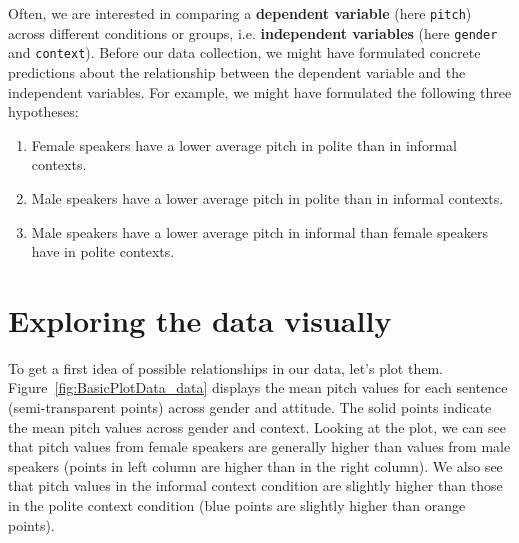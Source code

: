 \documentclass[nobib]{tufte-handout}
\begin{document}
Often, we are interested in comparing a \textbf{dependent variable} (here \texttt{pitch})
across different conditions or groups, i.e. \textbf{independent variables} (here \texttt{gender} and \texttt{context}). Before our data collection,
we might have formulated concrete predictions about the relationship between the dependent
variable and the independent variables. For example, we might have formulated the following three
hypotheses:

\begin{enumerate}[{H}1:]
\item Female speakers have a lower average pitch in polite than in informal contexts.
\item Male speakers have a lower average pitch in polite than in informal contexts.
\item Male speakers have a lower average pitch in informal than female speakers have in polite contexts.
\end{enumerate}

\section{Exploring the data visually}

To get a first idea of possible relationships in our data, let's plot
them. Figure~\ref{fig:BasicPlotData_data} displays the mean pitch values for each
sentence (semi-transparent points) across gender and attitude. The solid points indicate the
mean pitch values across gender and context. Looking at the plot, we can see that pitch values
from female speakers are generally higher than values from male speakers (points in left column
are higher than in the right column). We also see that pitch values in the informal context
condition are slightly higher than those in the polite context condition (blue points are
slightly higher than orange points).
\end{document}

